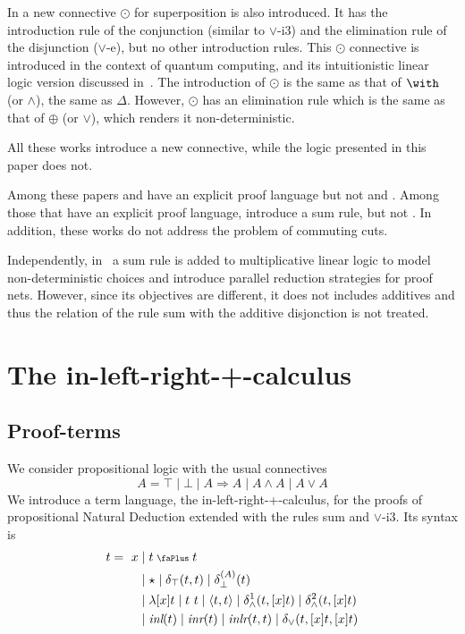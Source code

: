 \documentclass[screen, sigconf,authorversion,nonacm]{acmart}
\theoremstyle{acmdefinition}
\numberwithin{equation}{section}
\newcommand\abstr[1]{[#1]}
\newcommand\inl{\mbox{\it inl}}
\newcommand\inr{\mbox{\it inr}}
\newcommand\inlr{\mbox{\it inlr}}
\newcommand\elimtop{\delta_{\top}}
\newcommand\elimbot[1]{\delta^{(#1)}_{\bot}}
\newcommand\elimand{\delta_{\wedge}}
\newcommand\elimor{\delta_{\vee}}
\newcommand\plus{\mathrel{\text{\normalfont\scalebox{0.7}{\faPlus}}}}
\newcommand\pair[2]{\langle #1, #2 \rangle}
\begin{document}
In \cite{DiazcaroDowekTCS23} a new connective $\odot$ for
superposition is also introduced. It has the introduction rule of the
conjunction (similar to $\vee$-i3) and the elimination rule of the
disjunction ($\vee$-e), but no other introduction rules.  This $\odot$
connective is introduced in the context of quantum computing, and its
intuitionistic linear logic version discussed
in~\cite{DiazcaroDowekMSCS24}. The introduction of $\odot$ is the same
as that of $\with$ (or $\wedge$), the same as $\Delta$. However,
$\odot$ has an elimination rule which is the same as that of $\oplus$ (or $\vee$),
which renders it non-deterministic.

All these works introduce a new connective, while the logic presented
in this paper does not.

Among these papers \cite{SatoshiIPSJ96} and \cite{DiazcaroDowekTCS23}
have an explicit proof language  but not \cite{TzouvarasIGPL17} and
\cite{TzouvarasIGPL19}.
Among those that have an explicit proof language, 
\cite{DiazcaroDowekTCS23} introduce a sum rule, but not
\cite{SatoshiIPSJ96}.
In addition, these works do not address the problem of commuting cuts.

Independently, in~\cite{MogbilFOPARA09} a sum rule is added to multiplicative linear logic to model non-deterministic choices and introduce parallel reduction strategies for proof nets.  However, since its objectives are different, it does not includes additives and thus the relation of the rule sum with the additive disjonction is not treated.



\section{The in-left-right-+-calculus}
\label{sec:inlrcalculus}

\subsection{Proof-terms}

We consider propositional logic with the usual connectives
\[
  A = \top \mid \bot \mid A \Rightarrow A \mid A \wedge A \mid A \vee A
\]
We introduce a term language, the in-left-right-+-calculus, for the proofs of
propositional Natural Deduction extended with the rules sum and
$\vee$-i3. Its syntax is
\begin{align*}
  t =~ x & \mid t \plus t\\
  & \mid \star \mid \elimtop(t,t) \mid \elimbot{A}(t)\\
  &\mid \lambda \abstr{x}t\mid t~t
  \mid \pair{t}{t} \mid \elimand^1(t,\abstr{x}t)
  \mid \elimand^2(t,\abstr{x}t)
  \\
  &\mid \inl(t) \mid \inr(t) \mid \inlr(t,t)
  \mid \elimor(t,\abstr{x}t,\abstr{x}t)
\end{align*}
\end{document}
